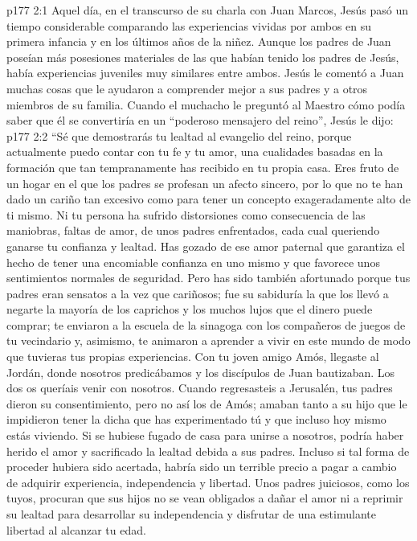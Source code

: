 \vs p177 2:1 Aquel día, en el transcurso de su charla con Juan Marcos, Jesús pasó un tiempo considerable comparando las experiencias vividas por ambos en su primera infancia y en los últimos años de la niñez. Aunque los padres de Juan poseían más posesiones materiales de las que habían tenido los padres de Jesús, había experiencias juveniles muy similares entre ambos. Jesús le comentó a Juan muchas cosas que le ayudaron a comprender mejor a sus padres y a otros miembros de su familia. Cuando el muchacho le preguntó al Maestro cómo podía saber que él se convertiría en un “poderoso mensajero del reino”, Jesús le dijo:
\vs p177 2:2 “Sé que demostrarás tu lealtad al evangelio del reino, porque actualmente puedo contar con tu fe y tu amor, una cualidades basadas en la formación que tan tempranamente has recibido en tu propia casa. Eres fruto de un hogar en el que los padres se profesan un afecto sincero, por lo que no te han dado un cariño tan excesivo como para tener un concepto exageradamente alto de ti mismo. Ni tu persona ha sufrido distorsiones como consecuencia de las maniobras, faltas de amor, de unos padres enfrentados, cada cual queriendo ganarse tu confianza y lealtad. Has gozado de ese amor paternal que garantiza el hecho de tener una encomiable confianza en uno mismo y que favorece unos sentimientos normales de seguridad. Pero has sido también afortunado porque tus padres eran sensatos a la vez que cariñosos; fue su sabiduría la que los llevó a negarte la mayoría de los caprichos y los muchos lujos que el dinero puede comprar; te enviaron a la escuela de la sinagoga con los compañeros de juegos de tu vecindario y, asimismo, te animaron a aprender a vivir en este mundo de modo que tuvieras tus propias experiencias. Con tu joven amigo Amós, llegaste al Jordán, donde nosotros predicábamos y los discípulos de Juan bautizaban. Los dos os queríais venir con nosotros. Cuando regresasteis a Jerusalén, tus padres dieron su consentimiento, pero no así los de Amós; amaban tanto a su hijo que le impidieron tener la dicha que has experimentado tú y que incluso hoy mismo estás viviendo. Si se hubiese fugado de casa para unirse a nosotros, podría haber herido el amor y sacrificado la lealtad debida a sus padres. Incluso si tal forma de proceder hubiera sido acertada, habría sido un terrible precio a pagar a cambio de adquirir experiencia, independencia y libertad. Unos padres juiciosos, como los tuyos, procuran que sus hijos no se vean obligados a dañar el amor ni a reprimir su lealtad para desarrollar su independencia y disfrutar de una estimulante libertad al alcanzar tu edad.
